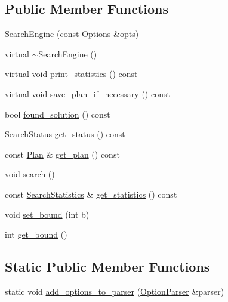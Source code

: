 \subsection*{Public Member Functions}
\begin{DoxyCompactItemize}
\item 
\hyperlink{classSearchEngine_aa28bc22933ce50faebba4d87279ddc17}{Search\-Engine} (const \hyperlink{classOptions}{Options} \&opts)
\item 
virtual \hyperlink{classSearchEngine_a863ab87efd742b9a8f20b87774ab570f}{$\sim$\-Search\-Engine} ()
\item 
virtual void \hyperlink{classSearchEngine_a237e4e74b03bc1e1f777e91d98e62490}{print\-\_\-statistics} () const 
\item 
virtual void \hyperlink{classSearchEngine_a42484decda17a8073d315594de94eb88}{save\-\_\-plan\-\_\-if\-\_\-necessary} () const 
\item 
bool \hyperlink{classSearchEngine_a19a4c78770ceca16897f1af6f9abdcfe}{found\-\_\-solution} () const 
\item 
\hyperlink{search__engine_8h_a366b21ffe1b22f34ec2fa8f101b979f3}{Search\-Status} \hyperlink{classSearchEngine_a1380aabf4e137ccc36c88546e16a731b}{get\-\_\-status} () const 
\item 
const \hyperlink{classSearchEngine_a847191ccfee2c9e52d94aac85e144e2a}{Plan} \& \hyperlink{classSearchEngine_aa9247578b9d90d249148097fb7fda6a3}{get\-\_\-plan} () const 
\item 
void \hyperlink{classSearchEngine_a854ed0ccddcb77ac90f0f286ccc5d459}{search} ()
\item 
const \hyperlink{classSearchStatistics}{Search\-Statistics} \& \hyperlink{classSearchEngine_a025c575d3100fafed66faed535449246}{get\-\_\-statistics} () const 
\item 
void \hyperlink{classSearchEngine_ad1d3c8d14d209c139c49f6503910a05a}{set\-\_\-bound} (int b)
\item 
int \hyperlink{classSearchEngine_a579e6725c6ff20d94320933141fe022a}{get\-\_\-bound} ()
\end{DoxyCompactItemize}
\subsection*{Static Public Member Functions}
\begin{DoxyCompactItemize}
\item 
static void \hyperlink{classSearchEngine_a3dcbdd70e489f491e52f4175961916c8}{add\-\_\-options\-\_\-to\-\_\-parser} (\hyperlink{classOptionParser}{Option\-Parser} \&parser)
\end{DoxyCompactItemize}
